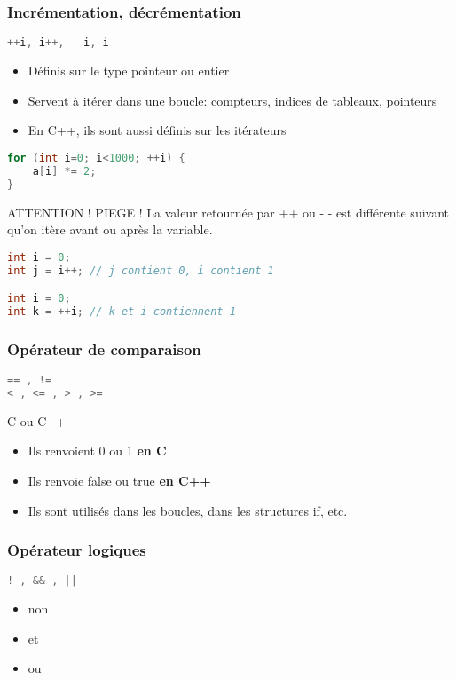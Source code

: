 \documentclass{beamer}
\begin{document}
\begin{frame}[fragile=singleslide,shrink=20]
\frametitle{Incrémentation, décrémentation}
\begin{lstlisting}[language=c++]
++i, i++, --i, i--
\end{lstlisting}

\begin{itemize}
\item{Définis sur le type pointeur ou entier}
\item{Servent à itérer dans une boucle: compteurs, indices de tableaux, pointeurs}
\item{En C++, ils sont aussi définis sur les itérateurs}
\end{itemize}
\begin{lstlisting}[language=c++]
for (int i=0; i<1000; ++i) {
    a[i] *= 2;
}
\end{lstlisting}

\begin{block}{ATTENTION ! PIEGE !}
La valeur retournée par ++ ou - - est différente suivant qu'on itère avant ou après la variable.
\begin{lstlisting}[language=c++]
int i = 0;
int j = i++; // j contient 0, i contient 1

int i = 0;
int k = ++i; // k et i contiennent 1
\end{lstlisting}
\end{block}
\end{frame}

\begin{frame}[fragile=singleslide,shrink=20]
\frametitle{Opérateur de comparaison}
\begin{lstlisting}[language=c++]
== , !=
< , <= , > , >=
\end{lstlisting}

\begin{block}{C ou C++}
\begin{itemize}
\item{Ils renvoient 0 ou 1 \textbf{en C}}
\item{Ils renvoie false ou true \textbf{en C++}}
\item{Ils sont utilisés dans les boucles, dans les structures if, etc.}
\end{itemize}
\end{block}
\end{frame}

\begin{frame}[fragile=singleslide,shrink=20]
\frametitle{Opérateur logiques}
\begin{lstlisting}[language=c++]
! , && , ||
\end{lstlisting}
\begin{itemize}
\item{non}
\item{et}
\item{ou}
\end{itemize}
\end{frame}
\end{document}
